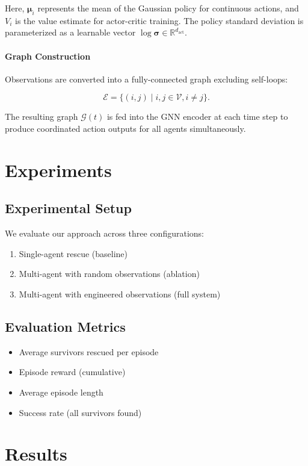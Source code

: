 \documentclass[conference]{IEEEtran}
\begin{document}
Here, \(\boldsymbol{\mu}_i\) represents the mean of the Gaussian policy for continuous actions, and \(V_i\) is the value estimate for actor-critic training. The policy standard deviation is parameterized as a learnable vector \(\log \boldsymbol{\sigma} \in \mathbb{R}^{d_\text{act}}\).

\paragraph{Graph Construction} Observations are converted into a fully-connected graph excluding self-loops:

\[
\mathcal{E} = \{ (i,j) \mid i,j \in \mathcal{V}, i \neq j \}.
\]

The resulting graph \(\mathcal{G}(t)\) is fed into the GNN encoder at each time step to produce coordinated action outputs for all agents simultaneously.

\section{Experiments}
\subsection{Experimental Setup}
We evaluate our approach across three configurations:
\begin{enumerate}
    \item Single-agent rescue (baseline)
    \item Multi-agent with random observations (ablation)
    \item Multi-agent with engineered observations (full system)
\end{enumerate}

\subsection{Evaluation Metrics}
\begin{itemize}
    \item Average survivors rescued per episode
    \item Episode reward (cumulative)
    \item Average episode length
    \item Success rate (all survivors found)
\end{itemize}

\section{Results}
\end{document}
